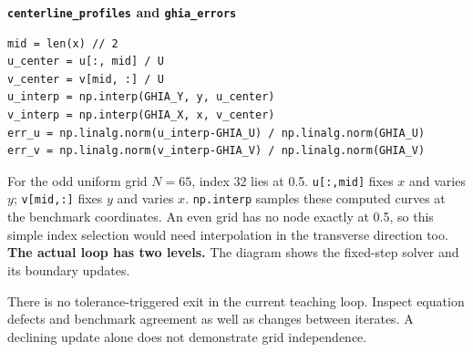 \textbf{\texttt{centerline\_profiles} and \texttt{ghia\_errors}}
\begin{lstlisting}
mid = len(x) // 2
u_center = u[:, mid] / U
v_center = v[mid, :] / U
u_interp = np.interp(GHIA_Y, y, u_center)
v_interp = np.interp(GHIA_X, x, v_center)
err_u = np.linalg.norm(u_interp-GHIA_U) / np.linalg.norm(GHIA_U)
err_v = np.linalg.norm(v_interp-GHIA_V) / np.linalg.norm(GHIA_V)
\end{lstlisting}
For the odd uniform grid $N=65$, index 32 lies at 0.5. \texttt{u[:,mid]} fixes $x$ and varies $y$; \texttt{v[mid,:]} fixes $y$ and varies $x$. \texttt{np.interp} samples these computed curves at the benchmark coordinates. An even grid has no node exactly at 0.5, so this simple index selection would need interpolation in the transverse direction too.
\newpage
{}\label{sec:visual-guide}
\textbf{The actual loop has two levels.} The diagram shows the fixed-step solver and its boundary updates.
\begin{center}
\end{center}
There is no tolerance-triggered exit in the current teaching loop. Inspect equation defects and benchmark agreement as well as changes between iterates. A declining update alone does not demonstrate grid independence.

